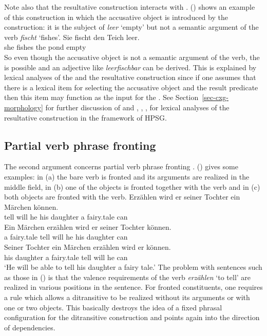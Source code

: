 \documentclass[output=paper]{langsci/langscibook}
\begin{document}
Note also that the resultative construction interacts with \bard. () shows an example of this
construction in which the accusative object is introduced by the construction: it is the subject of
\emph{leer} `empty' but not a semantic argument of the verb \emph{fischt} `fishes'.
\ea
\gll Sie fischt den Teich leer.\\
     she fishes the pond empty\\
\z
So even though the accusative object is not a semantic argument of the verb, the \bard is possible
and an adjective like \emph{leerfischbar} can be derived. This is explained by lexical analyses of
the \bard and the resultative construction since if one assumes that there is a lexical item for
 selecting the accusative object and the result predicate then this item may function as
the input for the \bard. See Section~\ref{sec-cxg-morphology} for further discussion of \bard and
 , , ,  for lexical analyses of the resultative construction in the framework of HPSG.

\subsection{Partial verb phrase fronting}

The second argument concerns partial verb phrase fronting \citep[Section~5.5.2]{MuellerGT-Eng1}. 
() gives some examples: in (a) the bare verb is fronted and its arguments are realized
in the middle field, in (b) one of the objects is fronted together with the verb and in
(c) both objects are fronted with the verb.
\eal
\ex 
\gll Erzählen wird er seiner Tochter ein Märchen können.\\
     tell will he his daughter a fairy.tale can\\
\ex 
\gll Ein Märchen erzählen wird er seiner Tochter können.\\
     a fairy.tale tell will he his daughter can\\
\ex 
\gll Seiner Tochter ein Märchen erzählen wird er können.\\
     his daughter a fairy.tale tell will he can\\
\glt `He will be able to tell his daughter a fairy tale.'
\zl
The problem with sentences such as those in () is that the valence requirements of the verb
\emph{erzählen} `to tell' are realized in various positions in the sentence. For fronted
constituents, one requires a rule which allows a ditransitive to be realized without its arguments
or with one or two objects. This basically destroys the idea of a fixed phrasal configuration for
the ditransitive construction and points again into the direction of dependencies.
\end{document}
